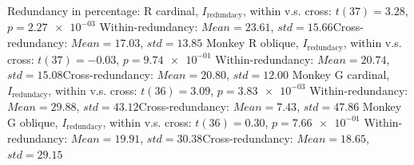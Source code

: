 Redundancy in percentage: \nMonkey R cardinal, $I_\textrm{redundacy}$, within v.s. cross: $t(37) = 3.28$, $p = \num{2.27e-03}$ 
Within-redundancy: $Mean = 23.61$, $std = 15.66$Cross-redundancy: $Mean = 17.03$, $std = 13.85$ 
Monkey R oblique, $I_\textrm{redundacy}$, within v.s. cross: $t(37) = -0.03$, $p = \num{9.74e-01}$ 
Within-redundancy: $Mean = 20.74$, $std = 15.08$Cross-redundancy: $Mean = 20.80$, $std = 12.00$ 
Monkey G cardinal, $I_\textrm{redundacy}$, within v.s. cross: $t(36) = 3.09$, $p = \num{3.83e-03}$ 
Within-redundancy: $Mean = 29.88$, $std = 43.12$Cross-redundancy: $Mean = 7.43$, $std = 47.86$ 
Monkey G oblique, $I_\textrm{redundacy}$, within v.s. cross: $t(36) = 0.30$, $p = \num{7.66e-01}$ 
Within-redundancy: $Mean = 19.91$, $std = 30.38$Cross-redundancy: $Mean = 18.65$, $std = 29.15$ 
